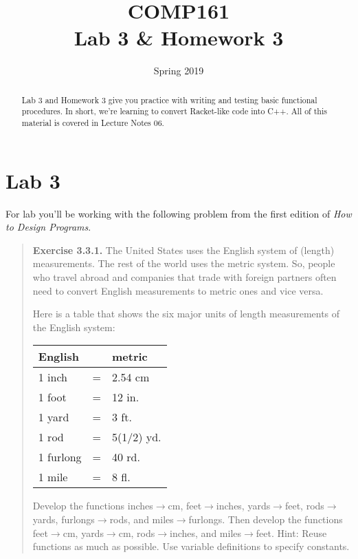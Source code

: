 \documentclass[nobib]{tufte-handout}
\title{COMP161 \\ Lab 3 \& Homework 3}
\author{}
\date{Spring 2019}
\begin{document}
\maketitle

\begin{abstract}
Lab 3 and Homework 3 give you practice with writing and testing basic functional procedures.  In short, we're learning to convert
Racket-like code into C++. All of this material is covered in Lecture Notes 06.
\end{abstract}

\section{Lab 3}

For lab you'll be working with the following problem from the first edition of \textit{How to Design Programs}.
\begin{framed}
\begin{quote}
\textbf{Exercise 3.3.1.}   The United States uses the English system of (length) measurements. The rest of the world uses the metric system. So, people who travel abroad and companies that trade with foreign partners often need to convert English measurements to metric ones and vice versa.

Here is a table that shows the six major units of length measurements of the English system:


\begin{center}
\begin{tabular}{lcl}
English & &  metric \\ \toprule
1 inch	&=&	2.54	cm \\
1 foot	&=&	12	in. \\
1 yard	&=&	3	ft. \\
1 rod	&=&	5(1/2)	yd.\\
1 furlong	&=&	40	rd.\\
1 mile	&=&	8	fl.
\end{tabular}
\end{center}

Develop the functions inches$\rightarrow$cm, feet$\rightarrow$inches, yards$\rightarrow$feet, rods$\rightarrow$yards, furlongs$\rightarrow$rods, and miles$\rightarrow$furlongs.
Then develop the functions feet$\rightarrow$cm, yards$\rightarrow$cm, rods$\rightarrow$inches, and miles$\rightarrow$feet.
Hint: Reuse functions as much as possible. Use variable definitions to specify constants.
\end{quote}
\end{framed}
\end{document}
